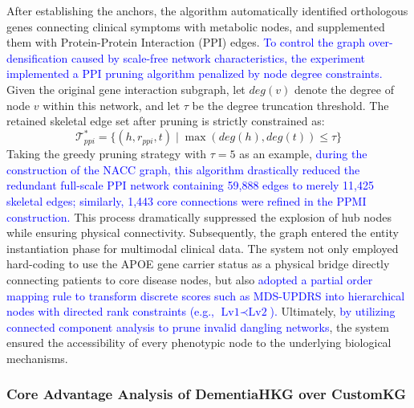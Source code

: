 \documentclass[lettersize,journal]{IEEEtran}
\begin{document}
After establishing the anchors, the algorithm automatically identified orthologous genes connecting clinical symptoms with metabolic nodes, and supplemented them with Protein-Protein Interaction (PPI) edges. \textcolor{blue}{To control the graph over-densification caused by scale-free network characteristics, the experiment implemented a PPI pruning algorithm penalized by node degree constraints.} Given the original gene interaction subgraph, let $deg(v)$ denote the degree of node $v$ within this network, and let $\tau$ be the degree truncation threshold. The retained skeletal edge set after pruning is strictly constrained as:
\begin{equation}
\mathcal{T}_{ppi}^* = \{(h, r_{ppi}, t) \mid \max(deg(h), deg(t)) \le \tau\}
\label{eq:ppi_pruning_rule}
\end{equation}
Taking the greedy pruning strategy with $\tau=5$ as an example, \textcolor{blue}{during the construction of the NACC graph, this algorithm drastically reduced the redundant full-scale PPI network containing 59,888 edges to merely 11,425 skeletal edges; similarly, 1,443 core connections were refined in the PPMI construction.} This process dramatically suppressed the explosion of hub nodes while ensuring physical connectivity. Subsequently, the graph entered the entity instantiation phase for multimodal clinical data. The system not only employed hard-coding to use the APOE gene carrier status as a physical bridge directly connecting patients to core disease nodes, but also \textcolor{blue}{adopted a partial order mapping rule to transform discrete scores such as MDS-UPDRS into hierarchical nodes with directed rank constraints (e.g., $\text{Lv1} \prec \text{Lv2}$).} Ultimately, \textcolor{blue}{by utilizing connected component analysis to prune invalid dangling networks}, the system ensured the accessibility of every phenotypic node to the underlying biological mechanisms.



\subsubsection{Core Advantage Analysis of DementiaHKG over CustomKG}
\end{document}
